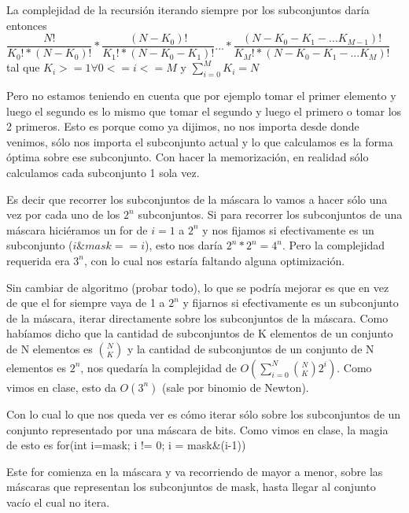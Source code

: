 La complejidad de la recursión iterando siempre por los subconjuntos daría entonces \newline $\dfrac{N!}{K_{0}! * (N - K_{0})!} * \dfrac{(N - K_{0})!}{K_{1}! * (N - K_{0} - K_{1})!} ... * \dfrac{(N - K_{0} - K_{1} - ... K_{M-1})!}{K_{M}! * (N - K_{0} - K_{1} - ... K_{M})!} $ tal que $K_{i} >= 1 \forall{0 <= i <= M}$ y $\sum_{i=0}^{M} K_{i} = N$  \newline


Pero no estamos teniendo en cuenta que por ejemplo tomar el primer elemento y luego el segundo es lo mismo que tomar el segundo y luego el primero o tomar los 2 primeros. Esto es porque como ya dijimos, no nos importa desde donde venimos, sólo nos importa el subconjunto actual y lo que calculamos es la forma óptima sobre ese subconjunto. Con hacer la memorización, en realidad sólo calculamos cada subconjunto 1 sola vez. \newline


Es decir que recorrer los subconjuntos de la máscara lo vamos a hacer sólo una vez por cada uno de los $2^{n}$ subconjuntos. Si para recorrer los subconjuntos de una máscara hiciéramos un for de $i = 1$ a $2^{n}$ y nos fijamos si efectivamente es un subconjunto ($i \& mask == i$), esto nos daría $2^{n} * 2^{n} = 4^{n}$. Pero la complejidad requerida era $3^{n}$, con lo cual nos estaría faltando alguna optimización. \newline


Sin cambiar de algoritmo (probar todo), lo que se podría mejorar es que en vez de que el for siempre vaya de 1 a $2^{n}$ y fijarnos si efectivamente es un subconjunto de la máscara, iterar directamente sobre los subconjuntos de la máscara. Como habíamos dicho que la cantidad de subconjuntos de K elementos de un conjunto de N elementos es $\binom{N}{K}$ y la cantidad de subconjuntos de un conjunto de N elementos es $2^{n}$, nos quedaría la complejidad de $O(\sum_{i=0}^{N} \binom{N}{K} 2^{i} )$. Como vimos en clase, esto da $O(3^{n})$ (sale por binomio de Newton). \newline

Con lo cual lo que nos queda ver es cómo iterar sólo sobre los subconjuntos de un conjunto representado por una máscara de bits. Como vimos en clase, la magia de esto es  \newline for(int i=mask; i != 0; i = mask\&(i-1))  \newline

Este for comienza en la máscara y va recorriendo de mayor a menor, sobre las máscaras que representan los subconjuntos de mask, hasta llegar al conjunto vacío el cual no itera. \newline

